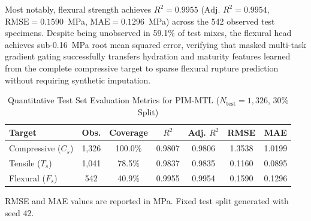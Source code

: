 \documentclass[conference]{IEEEtran}
\begin{document}
Most notably, flexural strength achieves $R^2 = 0.9955$ ($\text{Adj. } R^2 = 0.9954$, $\text{RMSE} = 0.1590$~MPa, $\text{MAE} = 0.1296$~MPa) across the 542 observed test specimens. Despite being unobserved in 59.1\% of test mixes, the flexural head achieves sub-0.16~MPa root mean squared error, verifying that masked multi-task gradient gating successfully transfers hydration and maturity features learned from the complete compressive target to sparse flexural rupture prediction without requiring synthetic imputation.

\begin{table}[t]
\caption{Quantitative Test Set Evaluation Metrics for PIM-MTL ($N_{\text{test}} = 1,326$, 30\% Split)}
\label{tab:results_summary}
\centering
\footnotesize
\setlength{\tabcolsep}{3.5pt}
\renewcommand{\arraystretch}{1.15}
\begin{tabularx}{\columnwidth}{@{}>{\raggedright\arraybackslash}Xcccccc@{}}
\toprule
\textbf{Target} & \textbf{Obs.} & \textbf{Coverage} & \textbf{$R^2$} & \textbf{Adj. $R^2$} & \textbf{RMSE} & \textbf{MAE} \\
\midrule
Compressive ($C_s$) & 1,326 & 100.0\% & 0.9807 & 0.9806 & 1.3538 & 1.0199 \\
Tensile ($T_s$)     & 1,041 & 78.5\%  & 0.9837 & 0.9835 & 0.1160 & 0.0895 \\
Flexural ($F_s$)    & 542   & 40.9\%  & 0.9955 & 0.9954 & 0.1590 & 0.1296 \\
\bottomrule
\end{tabularx}
\vspace{0.3ex}
\parbox{\columnwidth}{\footnotesize RMSE and MAE values are reported in MPa. Fixed test split generated with seed 42.}
\end{table}
\end{document}
